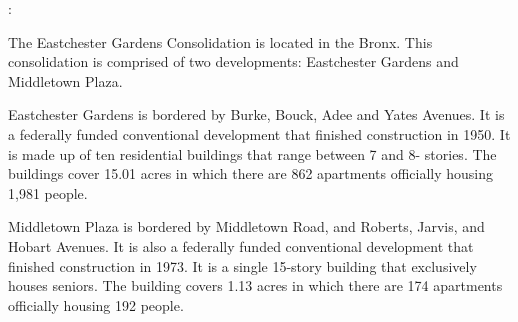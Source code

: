 :

The Eastchester Gardens Consolidation is located in the Bronx. This consolidation is comprised of two developments: Eastchester Gardens and Middletown Plaza.

Eastchester Gardens is bordered by Burke, Bouck, Adee and Yates Avenues.  It is a federally funded conventional development that finished construction in 1950. It is made up of ten residential buildings that range between 7 and 8- stories. The buildings cover 15.01 acres in which there are 862 apartments officially housing 1,981 people.   

  

Middletown Plaza is bordered by Middletown Road, and Roberts, Jarvis, and Hobart Avenues. It is also a federally funded conventional development that finished construction in 1973. It is a single 15-story building that exclusively houses seniors. The building covers 1.13 acres in which there are 174 apartments officially housing 192 people.